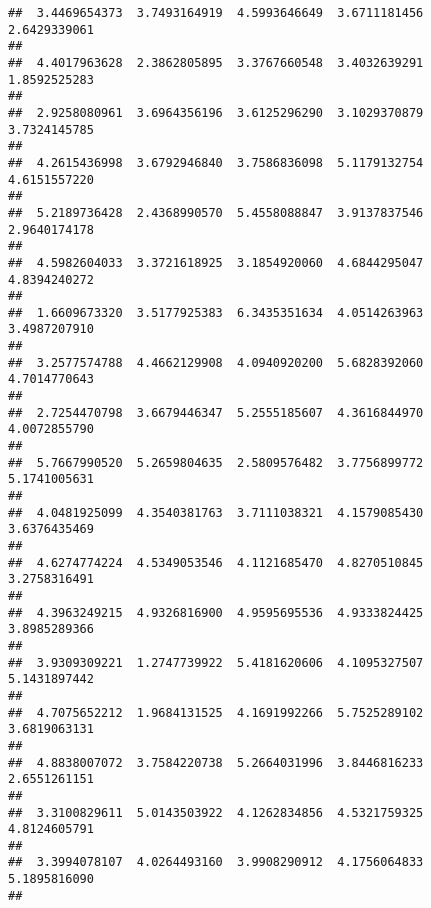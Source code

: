 \documentclass[]{article}
\begin{document}
\begin{verbatim}
##  3.4469654373  3.7493164919  4.5993646649  3.6711181456  2.6429339061 
##                                                                       
##  4.4017963628  2.3862805895  3.3767660548  3.4032639291  1.8592525283 
##                                                                       
##  2.9258080961  3.6964356196  3.6125296290  3.1029370879  3.7324145785 
##                                                                       
##  4.2615436998  3.6792946840  3.7586836098  5.1179132754  4.6151557220 
##                                                                       
##  5.2189736428  2.4368990570  5.4558088847  3.9137837546  2.9640174178 
##                                                                       
##  4.5982604033  3.3721618925  3.1854920060  4.6844295047  4.8394240272 
##                                                                       
##  1.6609673320  3.5177925383  6.3435351634  4.0514263963  3.4987207910 
##                                                                       
##  3.2577574788  4.4662129908  4.0940920200  5.6828392060  4.7014770643 
##                                                                       
##  2.7254470798  3.6679446347  5.2555185607  4.3616844970  4.0072855790 
##                                                                       
##  5.7667990520  5.2659804635  2.5809576482  3.7756899772  5.1741005631 
##                                                                       
##  4.0481925099  4.3540381763  3.7111038321  4.1579085430  3.6376435469 
##                                                                       
##  4.6274774224  4.5349053546  4.1121685470  4.8270510845  3.2758316491 
##                                                                       
##  4.3963249215  4.9326816900  4.9595695536  4.9333824425  3.8985289366 
##                                                                       
##  3.9309309221  1.2747739922  5.4181620606  4.1095327507  5.1431897442 
##                                                                       
##  4.7075652212  1.9684131525  4.1691992266  5.7525289102  3.6819063131 
##                                                                       
##  4.8838007072  3.7584220738  5.2664031996  3.8446816233  2.6551261151 
##                                                                       
##  3.3100829611  5.0143503922  4.1262834856  4.5321759325  4.8124605791 
##                                                                       
##  3.3994078107  4.0264493160  3.9908290912  4.1756064833  5.1895816090 
##                                                                       

\end{verbatim}
\end{document}
